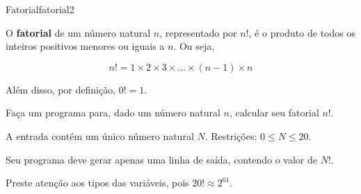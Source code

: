 \documentclass[12pt,a4paper,oneside]{article}
\begin{document}
\begin{problem}{Fatorial}{fatorial}{2}
 
O \textbf{fatorial} de um número natural $n$, representado por $n!$, é o produto de todos os inteiros positivos menores ou iguais a $n$. Ou seja,

$$n!=1 \times 2 \times 3 \times \dots \times (n-1) \times n$$

Além disso, por definição, $0! = 1$.

Faça um programa para, dado um número natural $n$, calcular seu fatorial $n!$.
%

\InputFile

A entrada contém um único número natural $N$. Restrições: $0 \leq N \leq 20$.


\OutputFile

Seu programa deve gerar apenas uma linha de saída, contendo o valor de $N!$.

\Notes
Preste atenção aos tipos das variáveis, pois $20! \approx 2^{61}$.

\Example

\begin{example}
%
\end{example}

\begin{example}
%
\end{example}

\begin{example}
%
\end{example}



\end{problem}
\end{document}
